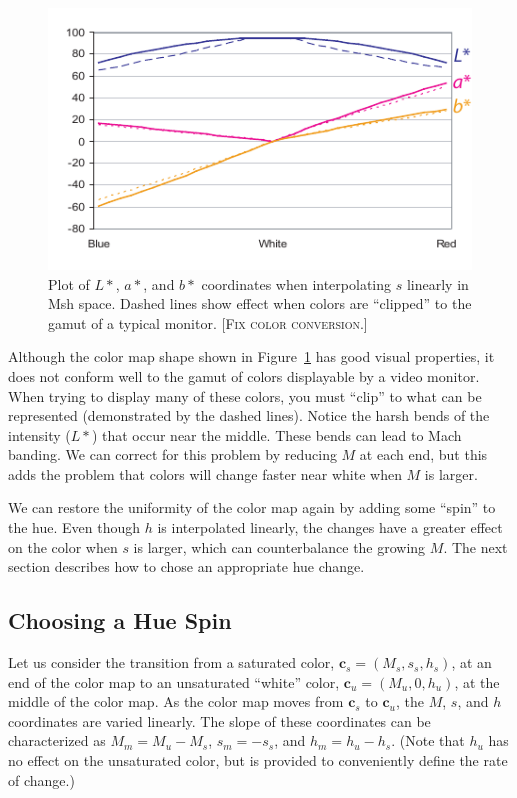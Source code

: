 \documentclass[review,journal]{vgtc}         %
\newcommand{\sticky}[1]{\textsc{[#1]}}
\newcommand{\Msh}{Msh\xspace}
\newcommand*{\cvec}[1]{\mathbf{#1}}
\begin{document}
\begin{figure}
  \centering
  \includegraphics{images/LinearMshPlot}
  \caption{Plot of $L*$, $a*$, and $b*$ coordinates when interpolating $s$
    linearly in \Msh space.  Dashed lines show effect when colors are
    ``clipped'' to the gamut of a typical monitor. \sticky{Fix color conversion.}}
  \label{fig:s_plot}
\end{figure}

Although the color map shape shown in Figure~\ref{fig:s_plot} has good
visual properties, it does not conform well to the gamut of colors
displayable by a video monitor.  When trying to display many of these
colors, you must ``clip'' to what can be represented (demonstrated by the
dashed lines).  Notice the harsh bends of the intensity ($L*$) that occur
near the middle.  These bends can lead to Mach banding.  We can correct for
this problem by reducing $M$ at each end, but this adds the problem that
colors will change faster near white when $M$ is larger.

We can restore the uniformity of the color map again by adding some
``spin'' to the hue.  Even though $h$ is interpolated linearly, the changes
have a greater effect on the color when $s$ is larger, which can
counterbalance the growing $M$.  The next section describes how to chose an
appropriate hue change.

\subsection{Choosing a Hue Spin}
\label{sec:ChoosingAHueSpin}

Let us consider the transition from a saturated color, $\cvec{c}_s=(M_s,
s_s, h_s)$, at an end of the color map to an unsaturated ``white'' color,
$\cvec{c}_u=(M_u, 0, h_u)$, at the middle of the color map.  As the
color map moves from $\cvec{c}_s$ to $\cvec{c}_u$, the $M$, $s$, and $h$
coordinates are varied linearly.  The slope of these coordinates can be
characterized as $M_m = M_u - M_s$, $s_m = -s_s$, and $h_m = h_u - h_s$.
(Note that $h_u$ has no effect on the unsaturated color, but is provided to
conveniently define the rate of change.)
\end{document}
